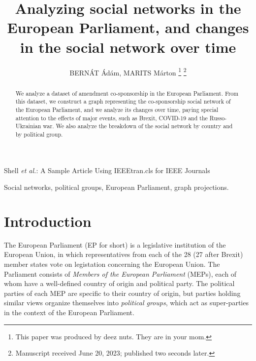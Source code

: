 \documentclass[lettersize,journal]{IEEEtran}
\begin{document}
\title{Analyzing social networks in the European Parliament, and changes in the social network over time}

\author{{BERNÁT Ádám, MARITS Márton}
\thanks{This paper was produced by deez nuts. They are in your mom.}%
\thanks{Manuscript received June 20, 2023; published two seconds later.}}

%
{Shell \MakeLowercase{\textit{et al.}}: A Sample Article Using IEEEtran.cls for IEEE Journals}


\maketitle

\begin{abstract}
We analyze a dataset of amendment co-sponsorship in the European Parliament. From this dataset, we construct a graph representing the co-sponsorship social network of the European Parliament, and we analyze its changes over time, paying special attention to the effects of major events, such as Brexit, COVID-19 and the Russo-Ukrainian war. We also analyze the breakdown of the social network by country and by political group.
\end{abstract}

\begin{IEEEkeywords}
Social networks, political groups, European Parliament, graph projections.
\end{IEEEkeywords}

\section{Introduction}



The European Parliament (EP for short) is a legislative institution of the European Union, in which representatives from each of the 28 (27 after Brexit) member states vote on legistation concerning the European Union. The Parliament consists of \textit{Members of the European Parliament} (MEPs), each of whom have a well-defined country of origin and political party. The political parties of each MEP are specific to their country of origin, but parties holding similar views organize themselves into \textit{political groups}, which act as super-parties in the context of the European Parliament.
\end{document}
